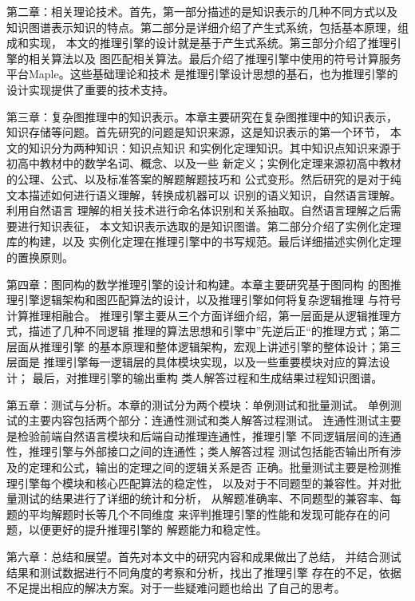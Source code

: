 \documentclass{standalone}
\begin{document}
第二章：相关理论技术。首先，第一部分描述的是知识表示的几种不同方式以及
知识图谱表示知识的特点。第二部分是详细介绍了产生式系统，包括基本原理，组成和实现，
本文的推理引擎的设计就是基于产生式系统。第三部分介绍了推理引擎的相关算法以及
图匹配相关算法。最后介绍了推理引擎中使用的符号计算服务平台Maple。这些基础理论和技术
是推理引擎设计思想的基石，也为推理引擎的设计实现提供了重要的技术支持。

第三章：复杂图推理中的知识表示。本章主要研究在复杂图推理中的知识表示，
知识存储等问题。首先研究的问题是知识来源，这是知识表示的第一个环节，
本文的知识分为两种知识：知识点知识
和实例化定理知识。其中知识点知识来源于初高中教材中的数学名词、概念、以及一些
新定义；实例化定理来源初高中教材的公理、公式、以及标准答案的解题解题技巧和
公式变形。然后研究的是对于纯文本描述如何进行语义理解，转换成机器可以
识别的语义知识，自然语言理解。利用自然语言
理解的相关技术进行命名体识别和关系抽取。自然语言理解之后需要进行知识表征，
本文知识表示选取的是知识图谱。第二部分介绍了实例化定理库的构建，以及
实例化定理在推理引擎中的书写规范。最后详细描述实例化定理的置换原则。

第四章：图同构的数学推理引擎的设计和构建。本章主要研究基于图同构
的图推理引擎逻辑架构和图匹配算法的设计，以及推理引擎如何将复杂逻辑推理
与符号计算推理相融合。
推理引擎主要从三个方面详细介绍，第一层面是从逻辑推理方式，描述了几种不同逻辑
推理的算法思想和引擎中”先逆后正“的推理方式；第二层面从推理引擎
的基本原理和整体逻辑架构，宏观上讲述引擎的整体设计；第三层面是
推理引擎每一逻辑层的具体模块实现，以及一些重要模块对应的算法设计；
最后，对推理引擎的输出重构
类人解答过程和生成结果过程知识图谱。


第五章：测试与分析。本章的测试分为两个模块：单例测试和批量测试。
单例测试的主要内容包括两个部分：连通性测试和类人解答过程测试。
连通性测试主要是检验前端自然语言模块和后端自动推理连通性，推理引擎
不同逻辑层间的连通性，推理引擎与外部接口之间的连通性；类人解答过程 
测试包括能否输出所有涉及的定理和公式，输出的定理之间的逻辑关系是否
正确。批量测试主要是检测推理引擎每个模块和核心匹配算法的稳定性，
以及对于不同题型的兼容性。并对批量测试的结果进行了详细的统计和分析，
从解题准确率、不同题型的兼容率、每题的平均解题时长等几个不同维度
来评判推理引擎的性能和发现可能存在的问题，以便更好的提升推理引擎的
解题能力和稳定性。

第六章：总结和展望。首先对本文中的研究内容和成果做出了总结，
并结合测试结果和测试数据进行不同角度的考察和分析，找出了推理引擎
存在的不足，依据不足提出相应的解决方案。对于一些疑难问题也给出
了自己的思考。
\end{document}
